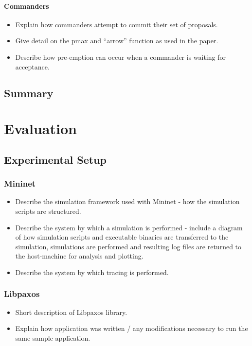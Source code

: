 \documentclass[12pt,twoside,notitlepage]{report}
\begin{document}
\subsubsection{Commanders}
\begin{itemize}
  \item Explain how commanders attempt to commit their set of proposals.
  \item Give detail on the pmax and ``arrow'' function as used in the paper.
  \item Describe how pre-emption can occur when a commander is waiting for acceptance.
\end{itemize}

\section{Summary}

\newpage

\chapter{Evaluation}

\section{Experimental Setup}
\subsection{Mininet}
\begin{itemize}
  \item Describe the simulation framework used with Mininet - how the simulation scripts are structured.
  \item Describe the system by which a simulation is performed - include a diagram of how simulation scripts and executable binaries are transferred to the simulation, simulations are performed and resulting log files are returned to the host-machine for analysis and plotting.
  \item Describe the system by which tracing is performed.
\end{itemize}

\subsection{Libpaxos}
\begin{itemize}
  \item Short description of Libpaxos library.
  \item Explain how application was written / any modifications necessary to run the same sample application.
\end{itemize}
\end{document}
